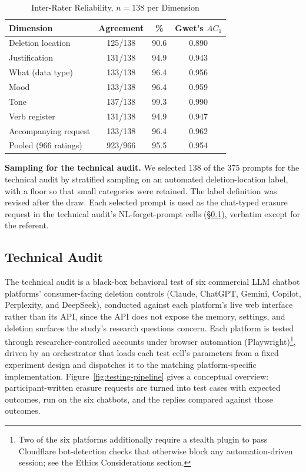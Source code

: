 \documentclass[conference,compsoc]{IEEEtran}
\begin{document}
\begin{table}[t]
\centering
\caption{Inter-Rater Reliability, $n=138$ per Dimension}
\label{tab:ac1}
\small
\begin{tabular}{lccc}
\toprule
Dimension & Agreement & \% & Gwet's $AC_1$ \\
\midrule
Deletion location        & 125/138 & 90.6 & 0.890 \\
Justification            & 131/138 & 94.9 & 0.943 \\
What (data type)         & 133/138 & 96.4 & 0.956 \\
Mood                     & 133/138 & 96.4 & 0.959 \\
Tone                     & 137/138 & 99.3 & 0.990 \\
Verb register            & 131/138 & 94.9 & 0.947 \\
Accompanying request     & 133/138 & 96.4 & 0.962 \\
\midrule
Pooled (966 ratings) & 923/966 & 95.5 & 0.954 \\
\bottomrule
\end{tabular}
\end{table}

\textbf{Sampling for the technical audit.} We selected 138 of the 375
prompts for the technical audit by stratified sampling on an automated
deletion-location label, with a floor so that small categories were retained.
The label definition was revised after the draw. Each selected prompt is used
as the chat-typed erasure request in the technical audit's NL-forget-prompt
cells (\S\ref{sec:audit-methodology}), verbatim except for the referent.

\subsection{Technical Audit}
\label{sec:audit-methodology}

The technical audit is a black-box behavioral test of six commercial LLM
chatbot platforms' consumer-facing deletion controls (Claude, ChatGPT,
Gemini, Copilot, Perplexity, and DeepSeek), conducted against each
platform's live web interface rather than its API, since the API does
not expose the memory, settings, and deletion surfaces the study's
research questions concern. Each platform is tested through
researcher-controlled accounts under browser automation
(Playwright)\footnote{Two of the six platforms additionally require a
stealth plugin to pass Cloudflare bot-detection checks that otherwise
block any automation-driven session; see the Ethics Considerations
section.}, driven by an orchestrator that loads each test cell's
parameters from a fixed experiment design and dispatches it to
the matching platform-specific implementation.
Figure~\ref{fig:testing-pipeline} gives a conceptual overview: participant-written
erasure requests are turned into test cases with expected outcomes, run on the
six chatbots, and the replies compared against those outcomes.
\end{document}
